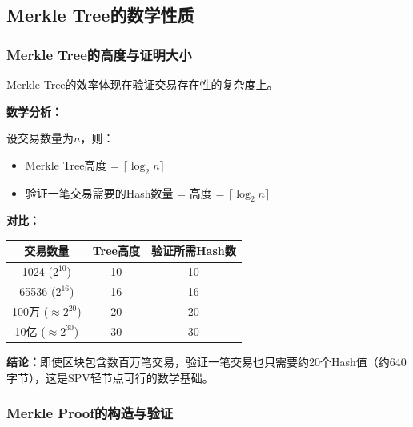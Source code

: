 ﻿\documentclass[12pt,a4paper]{article}
\begin{document}
\subsection{Merkle Tree的数学性质}

\subsubsection{Merkle Tree的高度与证明大小}

Merkle Tree的效率体现在验证交易存在性的复杂度上。

\begin{theorybox}
\textbf{数学分析：}

设交易数量为$n$，则：
\begin{itemize}[leftmargin=1.5em]
\item Merkle Tree高度 = $\lceil \log_2 n \rceil$
\item 验证一笔交易需要的Hash数量 = 高度 = $\lceil \log_2 n \rceil$
\end{itemize}

\textbf{对比：}
\begin{center}
\begin{tabular}{|c|c|c|}
\hline
\rowcolor{LightBG}
\textbf{交易数量} & \textbf{Tree高度} & \textbf{验证所需Hash数} \\
\hline
1024 ($2^{10}$) & 10 & 10 \\
\hline
65536 ($2^{16}$) & 16 & 16 \\
\hline
100万 ($\approx 2^{20}$) & 20 & 20 \\
\hline
10亿 ($\approx 2^{30}$) & 30 & 30 \\
\hline
\end{tabular}
\end{center}

\textbf{结论：}即使区块包含数百万笔交易，验证一笔交易也只需要约20个Hash值（约640字节），这是SPV轻节点可行的数学基础。
\end{theorybox}

\subsubsection{Merkle Proof的构造与验证}
\end{document}

